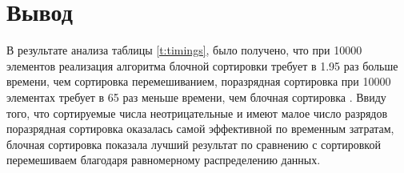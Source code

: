 \section*{Вывод}
В результате анализа таблицы \ref{t:timings}, было получено, что при 10000 элементов реализация алгоритма  блочной сортировки требует в 1.95 раз больше  времени, чем сортировка перемешиванием, поразрядная сортировка при 10000 элементах требует в 65 раз меньше времени, чем блочная сортировка . Ввиду того, что сортируемые числа неотрицательные и имеют малое число разрядов поразрядная сортировка оказалась самой эффективной по временным затратам, блочная сортировка показала лучший результат по сравнению с сортировкой перемешиваем благодаря равномерному распределению данных.


